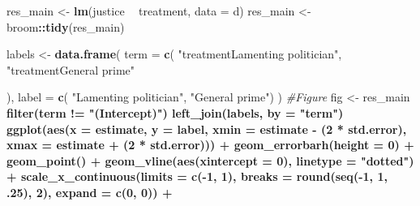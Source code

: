 \documentclass[]{book}
\newenvironment{Shaded}{\begin{snugshade}}{\end{snugshade}}
\newcommand{\KeywordTok}[1]{\textcolor[rgb]{0.13,0.29,0.53}{\textbf{#1}}}
\newcommand{\DataTypeTok}[1]{\textcolor[rgb]{0.13,0.29,0.53}{#1}}
\newcommand{\DecValTok}[1]{\textcolor[rgb]{0.00,0.00,0.81}{#1}}
\newcommand{\StringTok}[1]{\textcolor[rgb]{0.31,0.60,0.02}{#1}}
\newcommand{\CommentTok}[1]{\textcolor[rgb]{0.56,0.35,0.01}{\textit{#1}}}
\newcommand{\OperatorTok}[1]{\textcolor[rgb]{0.81,0.36,0.00}{\textbf{#1}}}
\newcommand{\NormalTok}[1]{#1}
\begin{document}
\begin{Shaded}
\begin{Highlighting}[]
\NormalTok{res_main <-}\StringTok{  }\KeywordTok{lm}\NormalTok{(justice }\OperatorTok{~}\StringTok{ }\NormalTok{treatment, }\DataTypeTok{data =}\NormalTok{ d) }
\NormalTok{res_main <-}\StringTok{ }\NormalTok{broom}\OperatorTok{::}\KeywordTok{tidy}\NormalTok{(res_main)}

\NormalTok{labels <-}\StringTok{ }\KeywordTok{data.frame}\NormalTok{(}
  \DataTypeTok{term =} \KeywordTok{c}\NormalTok{(}
    \StringTok{"treatmentLamenting politician"}\NormalTok{,}
    \StringTok{"treatmentGeneral prime"}
    
\NormalTok{  ),}
  \DataTypeTok{label =} \KeywordTok{c}\NormalTok{( }\StringTok{"Lamenting politician"}\NormalTok{,}
             \StringTok{"General prime"}\NormalTok{)}
\NormalTok{)}
\CommentTok{#Figure}
\NormalTok{fig <-}\StringTok{   }\NormalTok{res_main }\OperatorTok{%>%}
\StringTok{  }\KeywordTok{filter}\NormalTok{(term }\OperatorTok{!=}\StringTok{ "(Intercept)"}\NormalTok{) }\OperatorTok{%>%}\StringTok{ }
\StringTok{  }\KeywordTok{left_join}\NormalTok{(labels, }\DataTypeTok{by =} \StringTok{"term"}\NormalTok{) }\OperatorTok{%>%}\StringTok{ }
\StringTok{  }
\StringTok{  }\KeywordTok{ggplot}\NormalTok{(}\KeywordTok{aes}\NormalTok{(}\DataTypeTok{x =}\NormalTok{ estimate, }\DataTypeTok{y =}\NormalTok{ label,}
             \DataTypeTok{xmin =}\NormalTok{ estimate }\OperatorTok{-}\StringTok{ }\NormalTok{(}\DecValTok{2} \OperatorTok{*}\StringTok{ }\NormalTok{std.error),}
             \DataTypeTok{xmax =}\NormalTok{ estimate }\OperatorTok{+}\StringTok{ }\NormalTok{(}\DecValTok{2} \OperatorTok{*}\StringTok{ }\NormalTok{std.error))) }\OperatorTok{+}
\StringTok{   }\KeywordTok{geom_errorbarh}\NormalTok{(}\DataTypeTok{height =} \DecValTok{0}\NormalTok{) }\OperatorTok{+}
\StringTok{  }\KeywordTok{geom_point}\NormalTok{() }\OperatorTok{+}
\StringTok{  }\KeywordTok{geom_vline}\NormalTok{(}\KeywordTok{aes}\NormalTok{(}\DataTypeTok{xintercept =} \DecValTok{0}\NormalTok{), }\DataTypeTok{linetype =} \StringTok{"dotted"}\NormalTok{) }\OperatorTok{+}
\StringTok{  }\KeywordTok{scale_x_continuous}\NormalTok{(}\DataTypeTok{limits =} \KeywordTok{c}\NormalTok{(}\OperatorTok{-}\DecValTok{1}\NormalTok{, }\DecValTok{1}\NormalTok{),}
                     \DataTypeTok{breaks =} \KeywordTok{round}\NormalTok{(}\KeywordTok{seq}\NormalTok{(}\OperatorTok{-}\DecValTok{1}\NormalTok{, }\DecValTok{1}\NormalTok{, .}\DecValTok{25}\NormalTok{), }\DecValTok{2}\NormalTok{),}
                     \DataTypeTok{expand =} \KeywordTok{c}\NormalTok{(}\DecValTok{0}\NormalTok{, }\DecValTok{0}\NormalTok{)) }\OperatorTok{+}
}}}
\end{Highlighting}
\end{Shaded}
\end{document}

